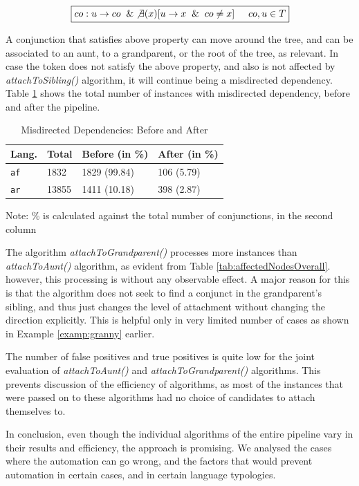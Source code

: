\begin{equation}
\boxed{
    co: u \rightarrow co \And \not\exists(x) [u \rightarrow x \And co \neq x] \hspace{5mm} co, u \in T
}
\label{eqn:movement-position}
\end{equation}

A conjunction that satisfies above property can move around the tree, and can be associated to an aunt, to a grandparent, or the root of the tree, as relevant. In case the token does not satisfy the above property, and also is not affected by \textit{attachToSibling()} algorithm, it will continue being a misdirected dependency. Table \ref{tab:misdirected-before-after} shows the total number of instances with misdirected dependency, before and after the pipeline.

\begin{table}[H]
    \centering
    \begin{tabular}{|l|l|l|l|}
    \hline
    \textbf{Lang.} & \textbf{Total} & Before (in \%) & After (in \%)\\
    \hline
    \texttt{af} & 1832 & 1829 (99.84) & 106 (5.79)\\
    \texttt{ar} & 13855 & 1411 (10.18) & 398 (2.87)\\
    \hline
    \end{tabular}
    \caption{Misdirected Dependencies: Before and After}
    Note: \% is calculated against the total number of conjunctions, in the second column
    \label{tab:misdirected-before-after}
\end{table}

The algorithm \textit{attachToGrandparent()} processes more instances than \textit{attachToAunt()} algorithm, as evident from Table \ref{tab:affectedNodesOverall}. however, this processing is without any observable effect. A major reason for this is that the algorithm does not seek to find a conjunct in the grandparent's sibling, and thus just changes the level of attachment without changing the direction explicitly. This is helpful only in very limited number of cases as shown in Example \ref{examp:granny} earlier. 

The number of false positives and true positives is quite low for the joint evaluation of \textit{attachToAunt()} and \textit{attachToGrandparent()} algorithms. This prevents discussion of the efficiency of algorithms, as most of the instances that were passed on to these algorithms had no choice of candidates to attach themselves to. 

In conclusion, even though the individual algorithms of the entire pipeline vary in their results and efficiency, the approach is promising. We analysed the cases where the automation can go wrong, and the factors that would prevent automation in certain cases, and in certain language typologies.

\newpage